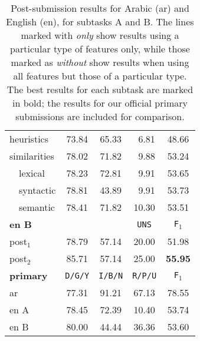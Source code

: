 \begin{table}[t]
\begin{tabular}{|l|cccc|}
 heuristics		& 73.84	& 65.33	& \,\,\,6.81	& 48.66\\
 similarities		& 78.02	& 71.82	& \,\,\,9.88	& 53.24	\\
 \,\,\,\, lexical	& 78.23	& 72.81	& \,\,\,9.91	& 53.65	\\
 \,\,\,\, syntactic	& 78.81	& 43.89	& \,\,\,9.91	& 53.73	 \\
 \,\,\,\, semantic	& 78.41	& 71.82	& 10.30		& 53.51	 \\   
  \hline
  \hline
  \bf en B	& \yes & \no	& \texttt{UNS}	& \texttt{F$_1$}\\ \hline
 post$_1$	& 78.79	& 57.14	& 20.00		& 51.98 \\
 post$_2$	& 85.71	& 57.14	& 25.00 	& \bf 55.95 \\
 \hline
 \hline  
 \bf primary	& \texttt{D/G/Y}& \texttt{I/B/N}& \texttt{R/P/U} & 
\texttt{F$_1$}\\\hline
  ar		& 77.31		& 91.21		& 67.13	& 78.55 \\
  en A		& 78.45		& 72.39		& 10.40	& 53.74 \\
  en B 		& 80.00		& 44.44		& 36.36	& 53.60 \\
  \hline
 
 
 \end{tabular}
 \caption{Post-submission results for Arabic (ar) and English (en), for subtasks A and B.
 The lines marked with \emph{only} show results  using a particular type of features only,
 while those marked as \emph{without} show results
 when using all features but those of a particular type.
 The best results for each subtask are marked in bold;
 the results for our official primary submissions are included for comparison.
\label{tab:aftertask}}
\end{table}




